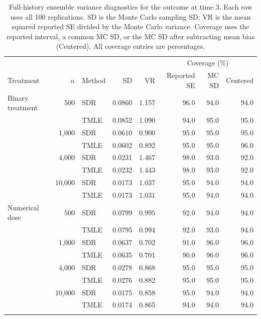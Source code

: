 \begin{table}[!htbp]
\centering\small
\setlength{\tabcolsep}{4pt}
\caption{Full-history ensemble variance diagnostics for the outcome at time 3. Each row uses all 100 replications. SD is the Monte Carlo sampling SD; VR is the mean squared reported SE divided by the Monte Carlo variance. Coverage uses the reported interval, a common MC SD, or the MC SD after subtracting mean bias (Centered). All coverage entries are percentages.}
\label{tab:sim-fh-mc-2}
\begin{tabular}{lrl*{5}{r}}
\toprule
& & & & & \multicolumn{3}{c}{Coverage (\%)}\\
Treatment & $n$ & Method & SD & VR & Reported SE & MC SD & Centered\\
\midrule
Binary treatment & 500 & SDR & 0.0860 & 1.157 & 96.0 & 94.0 & 94.0\\
 &  & TMLE & 0.0852 & 1.090 & 94.0 & 95.0 & 95.0\\
\addlinespace[2pt]
 & 1,000 & SDR & 0.0610 & 0.900 & 95.0 & 95.0 & 95.0\\
 &  & TMLE & 0.0602 & 0.892 & 95.0 & 95.0 & 96.0\\
\addlinespace[2pt]
 & 4,000 & SDR & 0.0231 & 1.467 & 98.0 & 93.0 & 92.0\\
 &  & TMLE & 0.0232 & 1.443 & 98.0 & 93.0 & 92.0\\
\addlinespace[2pt]
 & 10,000 & SDR & 0.0173 & 1.037 & 95.0 & 94.0 & 94.0\\
 &  & TMLE & 0.0173 & 1.031 & 95.0 & 94.0 & 94.0\\
\addlinespace[2pt]
\midrule
Numerical dose & 500 & SDR & 0.0799 & 0.995 & 92.0 & 94.0 & 94.0\\
 &  & TMLE & 0.0795 & 0.994 & 92.0 & 93.0 & 94.0\\
\addlinespace[2pt]
 & 1,000 & SDR & 0.0637 & 0.702 & 91.0 & 96.0 & 96.0\\
 &  & TMLE & 0.0635 & 0.701 & 90.0 & 96.0 & 96.0\\
\addlinespace[2pt]
 & 4,000 & SDR & 0.0278 & 0.868 & 95.0 & 95.0 & 95.0\\
 &  & TMLE & 0.0276 & 0.882 & 95.0 & 95.0 & 95.0\\
\addlinespace[2pt]
 & 10,000 & SDR & 0.0175 & 0.858 & 95.0 & 94.0 & 94.0\\
 &  & TMLE & 0.0174 & 0.865 & 94.0 & 94.0 & 94.0\\
\addlinespace[2pt]
\bottomrule
\end{tabular}
\end{table}
